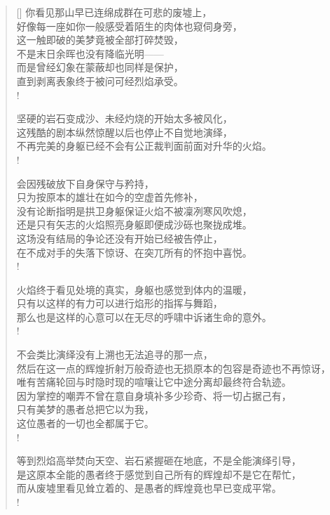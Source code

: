 \documentclass[UTF8, 12pt, a4paper]{ctexrep} %
\begin{document}
\begin{verse}[\versewidth]
你看见那山早已连绵成群在可悲的废墟上，\\
好像每一座如你一般感受着陌生的肉体也窥伺身旁，\\
这一触即破的美梦竟被全部打碎焚毁，\\
不是末日余晖也没有降临光明——\\
而是曾经幻象在蒙蔽却也同样是保护，\\
直到剥离表象终于被问可经烈焰承受。\\!

坚硬的岩石变成沙、未经灼烧的开始太多被风化，\\
这残酷的剧本纵然惊醒以后也停止不自觉地演绎，\\
不再完美的身躯已经不会有公正裁判面前面对升华的火焰。\\!

会因残破放下自身保守与矜持，\\
只为按原本的雄壮在如今的空虚首先修补，\\
没有论断指明是拱卫身躯保证火焰不被凜冽寒风吹熄，\\
还是只有矢志的火焰照亮身躯即便成沙砾也聚拢成堆。\\
这场没有结局的争论还没有开始已经被告停止，\\
在不成对手的失落下惊讶、在突兀所有的怀抱中喜悦。\\!

火焰终于看见处境的真实，身躯也感觉到体内的温暖，\\
只有以这样的有力可以进行焰形的指挥与舞蹈，\\
那么也是这样的心意可以在无尽的呼啸中诉诸生命的意外。\\!

不会类比演绎没有上溯也无法追寻的那一点，\\
然后在这一点的辉煌折射万般奇迹也无损原本的包容是奇迹也不再惊讶，\\
唯有苦痛轮回与时隐时现的喧嚷让它中途分离却最终符合轨迹。\\
因为掌控的嘲弄不曾在意自身填补多少珍奇、将一切占据己有，\\
只有美梦的愚者总把它以为我，\\
这位愚者的一切也全都属于它。\\!

等到烈焰高举焚向天空、岩石紧握砸在地底，不是全能演绎引导，\\
是这原本全能的愚者终于感觉到自己所有的辉煌却不是它在帮忙，\\
而从废墟里看见耸立着的、是愚者的辉煌竟也早已变成平常。\\!


\end{verse}
\end{document}
